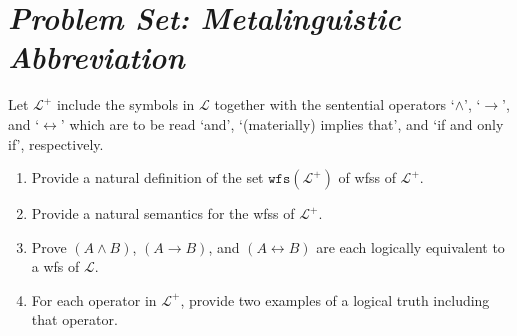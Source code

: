 \documentclass[a4paper, 11pt]{article} %
\newcommand{\wfs}[1]{\texttt{wfs}(#1)}
\newcommand{\V}[0]{\mathcal{V}}
\renewcommand{\L}[0]{\mathcal{L}}
\begin{document}
\section*{\it Problem Set: Metalinguistic Abbreviation}

Let $\L^+$ include the symbols in $\L$ together with the sentential operators `$\wedge$', `$\rightarrow$', and `$\leftrightarrow$' which are to be read `and', `(materially) implies that', and `if and only if', respectively.
\begin{enumerate}[leftmargin=.32in,labelsep=.15in,label=(\arabic*)]\small
\item Provide a natural definition of the set $\wfs{\L^+}$ of wfss of $\L^+$.
\item Provide a natural semantics for the wfss of $\L^+$.
\item Prove $(A\wedge B)$, $(A\rightarrow B)$, and $(A\leftrightarrow B)$ are each logically equivalent to a wfs of $\L$.
\item For each operator in $\L^+$, provide two examples of a logical truth including that operator. 
\end{enumerate}





\end{document}
